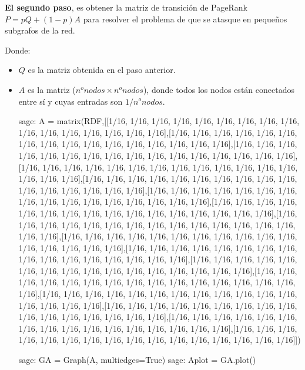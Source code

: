 \par \textbf{El segundo paso}, es obtener la matriz de transición de PageRank $P=pQ + (1-p)A$ para resolver el 
problema de que se atasque en pequeños subgrafos de la red.
\par Donde:
\begin{itemize}
    \item $Q$ es la matriz obtenida en el paso anterior.
    \item $A$ es la matriz ($n^onodos \times n^onodos$), donde todos los nodos están conectados entre sí y cuyas 
    entradas son $1/n^o nodos$.
    \begin{sagecommandline}
        sage: A = matrix(RDF,[[1/16, 1/16, 1/16, 1/16, 1/16, 1/16, 1/16, 1/16, 1/16, 1/16, 1/16, 1/16, 1/16, 1/16, 1/16, 1/16],[1/16, 1/16, 1/16, 1/16, 1/16, 1/16, 1/16, 1/16, 1/16, 1/16, 1/16, 1/16, 1/16, 1/16, 1/16, 1/16],[1/16, 1/16, 1/16, 1/16, 1/16, 1/16, 1/16, 1/16, 1/16, 1/16, 1/16, 1/16, 1/16, 1/16, 1/16, 1/16],[1/16, 1/16, 1/16, 1/16, 1/16, 1/16, 1/16, 1/16, 1/16, 1/16, 1/16, 1/16, 1/16, 1/16, 1/16, 1/16],[1/16, 1/16, 1/16, 1/16, 1/16, 1/16, 1/16, 1/16, 1/16, 1/16, 1/16, 1/16, 1/16, 1/16, 1/16, 1/16],[1/16, 1/16, 1/16, 1/16, 1/16, 1/16, 1/16, 1/16, 1/16, 1/16, 1/16, 1/16, 1/16, 1/16, 1/16, 1/16],[1/16, 1/16, 1/16, 1/16, 1/16, 1/16, 1/16, 1/16, 1/16, 1/16, 1/16, 1/16, 1/16, 1/16, 1/16, 1/16],[1/16, 1/16, 1/16, 1/16, 1/16, 1/16, 1/16, 1/16, 1/16, 1/16, 1/16, 1/16, 1/16, 1/16, 1/16, 1/16],[1/16, 1/16, 1/16, 1/16, 1/16, 1/16, 1/16, 1/16, 1/16, 1/16, 1/16, 1/16, 1/16, 1/16, 1/16, 1/16],[1/16, 1/16, 1/16, 1/16, 1/16, 1/16, 1/16, 1/16, 1/16, 1/16, 1/16, 1/16, 1/16, 1/16, 1/16, 1/16],[1/16, 1/16, 1/16, 1/16, 1/16, 1/16, 1/16, 1/16, 1/16, 1/16, 1/16, 1/16, 1/16, 1/16, 1/16, 1/16],[1/16, 1/16, 1/16, 1/16, 1/16, 1/16, 1/16, 1/16, 1/16, 1/16, 1/16, 1/16, 1/16, 1/16, 1/16, 1/16],[1/16, 1/16, 1/16, 1/16, 1/16, 1/16, 1/16, 1/16, 1/16, 1/16, 1/16, 1/16, 1/16, 1/16, 1/16, 1/16],[1/16, 1/16, 1/16, 1/16, 1/16, 1/16, 1/16, 1/16, 1/16, 1/16, 1/16, 1/16, 1/16, 1/16, 1/16, 1/16],[1/16, 1/16, 1/16, 1/16, 1/16, 1/16, 1/16, 1/16, 1/16, 1/16, 1/16, 1/16, 1/16, 1/16, 1/16, 1/16],[1/16, 1/16, 1/16, 1/16, 1/16, 1/16, 1/16, 1/16, 1/16, 1/16, 1/16, 1/16, 1/16, 1/16, 1/16, 1/16]])
    \end{sagecommandline} 
    \begin{sagecommandline}
        sage: GA = Graph(A, multiedges=True)
        sage: Aplot = GA.plot()
    \end{sagecommandline}
    

\end{itemize}
